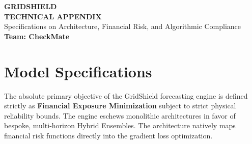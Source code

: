 \documentclass[11pt,a4paper]{article}
\begin{document}
\begin{titlepage}
    \centering
    \vspace*{4cm} %
    
    {\Huge \textbf{GRIDSHIELD}}\\[2em]
    {\huge \textbf{TECHNICAL APPENDIX}}\\[3em]
    
    {\Large Specifications on Architecture, Financial Risk, and Algorithmic Compliance}\\[4em]
    
    {\Large \textbf{Team: CheckMate}}\\[3em]
    
    \vfill %
    
\end{titlepage}

\newpage
\tableofcontents
\newpage

\section{Model Specifications}

The absolute primary objective of the GridShield forecasting engine is defined strictly as \textbf{Financial Exposure Minimization} subject to strict physical reliability bounds. The engine eschews monolithic architectures in favor of bespoke, multi-horizon Hybrid Ensembles. The architecture natively maps financial risk functions directly into the gradient loss optimization.
\end{document}
